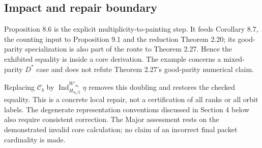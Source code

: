 \documentclass[10pt]{article}
\begin{document}
\subsection*{Impact and repair boundary}
Proposition 8.6 is the explicit multiplicity-to-painting step. It feeds Corollary 8.7, the counting input to Proposition 9.1 and the reduction Theorem 2.20; its good-parity specialization is also part of the route to Theorem 2.27. Hence the exhibited equality is inside a core derivation. The example concerns a mixed-parity \(D^*\) case and does not refute Theorem 2.27’s good-parity numerical claim.\par
Replacing \(\mathcal C_b\) by \(\operatorname{Ind}_{H_{n_b/2}}^{W'_{n_b}}\eta\) removes this doubling and restores the checked equality. This is a concrete local repair, not a certification of all ranks or all orbit labels. The degenerate representation conventions discussed in Section 4 below also require consistent correction. The Major assessment rests on the demonstrated invalid core calculation; no claim of an incorrect final packet cardinality is made.\par
\end{document}
